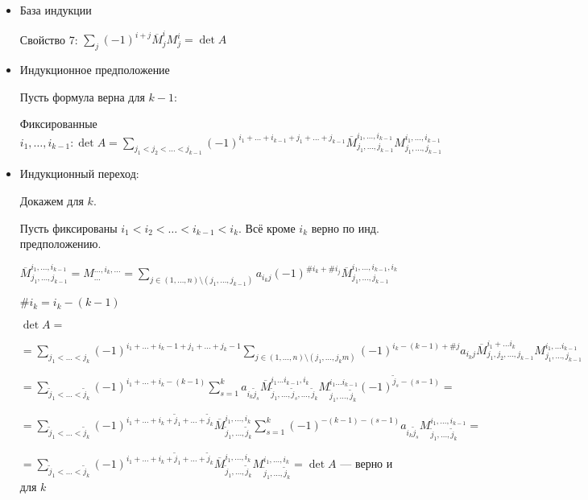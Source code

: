 \begin{itemize}
\item База индукции 

Свойство 7: \(\sum\limits_{j}(-1)^{i+j}\overline{M}_j^i M_j^i = \det A\)

\item Индукционное предположение

Пусть формула верна для \(k-1\):

Фиксированные \(i_1,\ldots,i_{k-1}: \det A = \sum\limits_{j_1<j_2<\ldots<j_{k-1}} (-1)^{i_1 + \ldots + i_{k-1}+j_1 + \ldots + j_{k-1}} \overline{M}_{j_1,\ldots, j_{k-1}}^{i_1,\ldots,i_{k-1}}M_{j_1,\ldots, j_{k-1}}^{i_1,\ldots,i_{k-1}}
\)


\item Индукционный переход:

Докажем для \(k\).

Пусть фиксированы \(i_1 < i_2 < \ldots < i_{k - 1} < i_k\). Всё кроме \(i_k\) верно по инд. предположению.

\(\overline{M}_{j_1, \ldots, j_{k - 1}}^{i_1, \ldots, i_{k - 1}} = M_{\ldots}^{\ldots, i_k, \ldots} = \sum\limits_{j \in (1, \ldots, n) \setminus (j_1, \ldots, j_{k-1})} a_{i_k j} (-1)^{\# i_k + \# i_j} \overline{M}_{j_1, \ldots, j_{k - 1}}^{i_1, \ldots, i_{k - 1}, i_k}\)

\(\# i_k = i_k - (k - 1)\)

\(\det A =\)

\(= \sum\limits_{j_1<\ldots<j_k} (-1)^{i_1+ \ldots+i_k-1 + j_1 + \ldots + j_k-1}\sum\limits_{j \in (1,\ldots,n)\setminus(j_1,\ldots,j_km)} (-1)^{i_k -(k-1) +\# j} a_{i_kj}\overline{M}_{j_1,j_2,\ldots,j_{k-1}}^{i_1 + \ldots i_k} M_{j_1,\ldots,j_{k-1}}^{i_1,\ldots i_{k-1}} \)

\(= \sum\limits_{\tilde j_1 < \ldots < \tilde j_k} (-1)^{i_1 + \ldots + i_k - (k - 1)} \sum\limits_{s = 1}^{k} a_{i_k \tilde j_s} \overline{M}_{\tilde j_1, \ldots, \tilde j_s, \ldots, \tilde j_k}^{i_1 \ldots i_{k - 1}, i_k} M_{\tilde j_1, \ldots, \tilde j_k}^{i_1 \ldots i_{k - 1}} (-1)^{\tilde j_s - (s - 1)} =\)

\(= \sum\limits_{\tilde j_1 < \ldots < \tilde j_k} (-1)^{i_1 + \ldots + i_k + \tilde j_1 + \ldots + \tilde j_k} \overline{M}_{\tilde j_1, \ldots, \tilde j_k}^{i_1, \ldots, i_k} \sum\limits_{s = 1}^{k} (-1)^{-(k - 1) - (s - 1)} a_{i_k \tilde j_s} M_{\tilde j_1, \ldots, \tilde j_k}^{i_1, \ldots, i_{k - 1}} =\)

\(= \sum\limits_{\tilde j_1 < \ldots < \tilde j_k} (-1)^{i_1 + \ldots + i_k + \tilde j_1 + \ldots + \tilde j_k} \overline{M}_{\tilde j_1, \ldots, \tilde j_k}^{i_1, \ldots, i_k} M_{\tilde j_1, \ldots, \tilde j_k}^{i_1, \ldots, i_k} = \det A\) --- верно и для \(k\)
\end{itemize}

